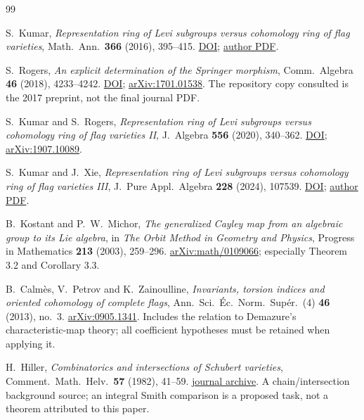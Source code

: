 \documentclass[11pt,letterpaper]{article}
\begin{document}
\begin{thebibliography}{99}\small\raggedright
\setlength{\itemsep}{1pt}
S.~Kumar, \emph{Representation ring of Levi subgroups versus cohomology ring
of flag varieties}, Math.\ Ann.\ \textbf{366} (2016), 395--415.
\href{https://doi.org/10.1007/s00208-015-1325-6}{DOI};
\href{https://kumar.math.unc.edu/papers/kumar76.pdf}{author PDF}.

S.~Rogers, \emph{An explicit determination of the Springer morphism},
Comm.\ Algebra \textbf{46} (2018), 4233--4242.
\href{https://doi.org/10.1080/00927872.2017.1407418}{DOI};
\href{https://arxiv.org/abs/1701.01538}{arXiv:1701.01538}.
The repository copy consulted is the 2017 preprint, not the final journal PDF.

S.~Kumar and S.~Rogers, \emph{Representation ring of Levi subgroups versus
cohomology ring of flag varieties II}, J.\ Algebra \textbf{556} (2020), 340--362.
\href{https://doi.org/10.1016/j.jalgebra.2020.02.029}{DOI};
\href{https://arxiv.org/abs/1907.10089}{arXiv:1907.10089}.

S.~Kumar and J.~Xie, \emph{Representation ring of Levi subgroups versus
cohomology ring of flag varieties III}, J.\ Pure Appl.\ Algebra
\textbf{228} (2024), 107539.
\href{https://doi.org/10.1016/j.jpaa.2023.107539}{DOI};
\href{https://kumar.math.unc.edu/papers/kumar86.pdf}{author PDF}.

B.~Kostant and P.~W.~Michor, \emph{The generalized Cayley map from an
algebraic group to its Lie algebra}, in \emph{The Orbit Method in Geometry
and Physics}, Progress in Mathematics \textbf{213} (2003), 259--296.
\href{https://arxiv.org/abs/math/0109066}{arXiv:math/0109066};
especially Theorem 3.2 and Corollary 3.3.

B.~Calm\`es, V.~Petrov and K.~Zainoulline,
\emph{Invariants, torsion indices and oriented cohomology of complete flags},
Ann.\ Sci.\ \'{E}c.\ Norm.\ Sup\'er.\ (4) \textbf{46} (2013), no.~3.
\href{https://arxiv.org/abs/0905.1341}{arXiv:0905.1341}.
Includes the relation to Demazure's characteristic-map theory;
all coefficient hypotheses must be retained when applying it.

H.~Hiller, \emph{Combinatorics and intersections of Schubert varieties},
Comment.\ Math.\ Helv.\ \textbf{57} (1982), 41--59.
\href{https://www.e-periodica.ch/cntmng?pid=com-001:1982:57::10}{journal archive}.
A chain/intersection background source; an integral Smith comparison
is a proposed task, not a theorem attributed to this paper.


\end{thebibliography}
\end{document}
